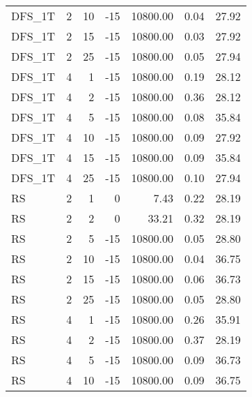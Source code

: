 \begin{center}
\begin{longtable}{lrrrrrr}
  DFS\_1T     & 2 & 10 & -15 & 10800.00 & 0.04 & 27.92 \\ 
  DFS\_1T     & 2 & 15 & -15 & 10800.00 & 0.03 & 27.92 \\ 
  DFS\_1T     & 2 & 25 & -15 & 10800.00 & 0.05 & 27.94 \\ 
  DFS\_1T     & 4 & 1 & -15 & 10800.00 & 0.19 & 28.12 \\ 
  DFS\_1T     & 4 & 2 & -15 & 10800.00 & 0.36 & 28.12 \\ 
  DFS\_1T     & 4 & 5 & -15 & 10800.00 & 0.08 & 35.84 \\ 
  DFS\_1T     & 4 & 10 & -15 & 10800.00 & 0.09 & 27.92 \\ 
  DFS\_1T     & 4 & 15 & -15 & 10800.00 & 0.09 & 35.84 \\ 
  DFS\_1T     & 4 & 25 & -15 & 10800.00 & 0.10 & 27.94 \\ 
  RS     & 2 & 1 &   0 & 7.43 & 0.22 & 28.19 \\ 
  RS     & 2 & 2 &   0 & 33.21 & 0.32 & 28.19 \\ 
  RS     & 2 & 5 & -15 & 10800.00 & 0.05 & 28.80 \\ 
  RS     & 2 & 10 & -15 & 10800.00 & 0.04 & 36.75 \\ 
  RS     & 2 & 15 & -15 & 10800.00 & 0.06 & 36.73 \\ 
  RS     & 2 & 25 & -15 & 10800.00 & 0.05 & 28.80 \\ 
  RS     & 4 & 1 & -15 & 10800.00 & 0.26 & 35.91 \\ 
  RS     & 4 & 2 & -15 & 10800.00 & 0.37 & 28.19 \\ 
  RS     & 4 & 5 & -15 & 10800.00 & 0.09 & 36.73 \\ 
  RS     & 4 & 10 & -15 & 10800.00 & 0.09 & 36.75 \\ 

\end{longtable}
\end{center}
